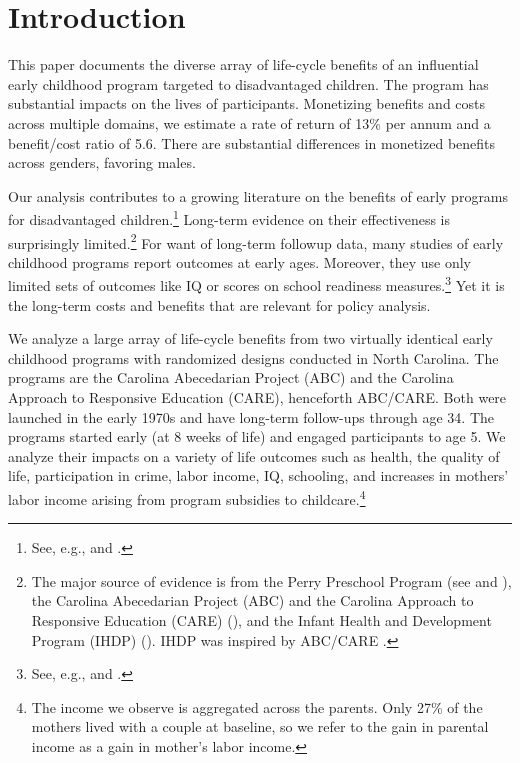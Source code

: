 \clearpage

\restoregeometry
\doublespacing

\setcounter{page}{0}

\section{Introduction}

This paper documents the diverse array of life-cycle benefits of an influential early childhood program targeted to disadvantaged children. The program has substantial impacts on the lives of participants. Monetizing benefits and costs across multiple domains, we estimate a rate of return of 13\% per annum and a benefit/cost ratio of 5.6. There are substantial differences in monetized benefits across genders, favoring males.

Our analysis contributes to a growing literature on the benefits of early programs for disadvantaged children.\footnote{See, e.g., \cite{Currie_2011_AER} and \cite{Elango_Hojman_etal_2016_Early-Edu}.} Long-term evidence on their effectiveness is surprisingly limited.\footnote{The major source of evidence is from the Perry Preschool Program (see \citealp{Schweinhart_Montie_ea_2005_BOOKlifetime} and \citealp{Heckman_Moon_etal_2010_RateofReturn,Heckman_Moon_etal_2010_QE}), the Carolina Abecedarian Project (ABC) and the Carolina Approach to Responsive Education (CARE) (\citealp{Ramey_Campbell_etal_2000_ADS,Ramey-etal_2012-ABC}), and the Infant Health and Development Program (IHDP) (\citealp{Gross_Spiker_etal_1997_BOOKHelpinglowbirth,Duncan_Sojourner_2013_JHR}). IHDP was inspired by ABC/CARE \citep[][]{Gross_Spiker_etal_1997_BOOKHelpinglowbirth}.} For want of long-term followup data, many studies of early childhood programs report outcomes at early ages. Moreover, they use only limited sets of outcomes like IQ or scores on school readiness measures.\footnote{See, e.g., \cite{Kline_Walters_2016_QJE} and \cite{Weiland_2013_CD_Impacts-of-Pre-K}.} Yet it is the long-term costs and benefits that are relevant for policy analysis.

We analyze a large array of life-cycle benefits from two virtually identical early childhood programs with randomized designs conducted in North Carolina. The programs are the Carolina Abecedarian Project (ABC) and the Carolina Approach to Responsive Education (CARE), henceforth ABC/CARE. Both were launched in the early 1970s and have long-term follow-ups through age 34. The programs started early (at 8 weeks of life) and engaged participants to age 5. We analyze their impacts on a variety of life outcomes such as health, the quality of life, participation in crime, labor income, IQ, schooling, and increases in mothers' labor income arising from program subsidies to childcare.\footnote{The income we observe is aggregated across the parents. Only 27\% of the mothers lived with a couple at baseline, so we refer to the gain in parental income as a gain in mother's labor income.}

